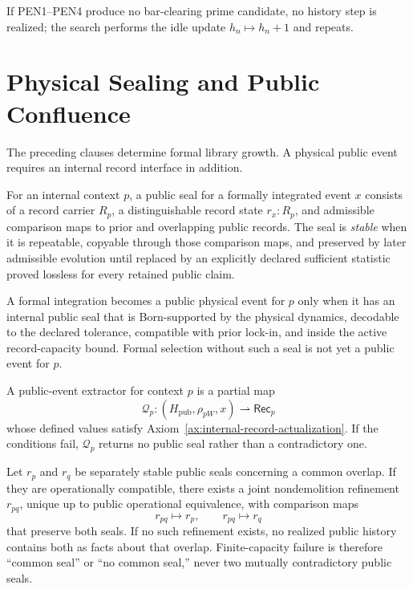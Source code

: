 If PEN1--PEN4 produce no bar-clearing prime candidate, no history step is
realized; the search performs the idle update \(h_n\mapsto h_n+1\) and repeats.

\section{Physical Sealing and Public Confluence}

The preceding clauses determine formal library growth. A physical public event
requires an internal record interface in addition.

\begin{definition}
For an internal context \(p\), a public seal for a formally integrated event
\(x\) consists of a record carrier \(R_p\), a distinguishable record state
\(r_x:R_p\), and admissible comparison maps to prior and overlapping public
records. The seal is \emph{stable} when it is repeatable, copyable through those
comparison maps, and preserved by later admissible evolution until replaced by
an explicitly declared sufficient statistic proved lossless for every retained
public claim.
\end{definition}

\begin{definition}
\label{ax:internal-record-actualization}
A formal integration becomes a public physical event for \(p\) only when it has
an internal public seal that is Born-supported by the physical dynamics,
decodable to the declared tolerance, compatible with prior lock-in, and inside
the active record-capacity bound. Formal selection without such a seal is not
yet a public event for \(p\).
\end{definition}

\begin{definition}
A public-event extractor for context \(p\) is a partial map
\[
\mathcal Q_p:
(H_{\mathrm{pub}},\rho_{pW},x)
\rightharpoonup
\mathsf{Rec}_p
\]
whose defined values satisfy Axiom~\ref{ax:internal-record-actualization}. If
the conditions fail, \(\mathcal Q_p\) returns no public seal rather than a
contradictory one.
\end{definition}

\begin{definition}
\label{ax:public-confluence}
Let \(r_p\) and \(r_q\) be separately stable public seals concerning a common
overlap. If they are operationally compatible, there exists a joint
nondemolition refinement \(r_{pq}\), unique up to public operational
equivalence, with comparison maps
\[
r_{pq}\longmapsto r_p,
\qquad
r_{pq}\longmapsto r_q
\]
that preserve both seals. If no such refinement exists, no realized public
history contains both as facts about that overlap. Finite-capacity failure is
therefore ``common seal'' or ``no common seal,'' never two mutually
contradictory public seals.
\end{definition}


